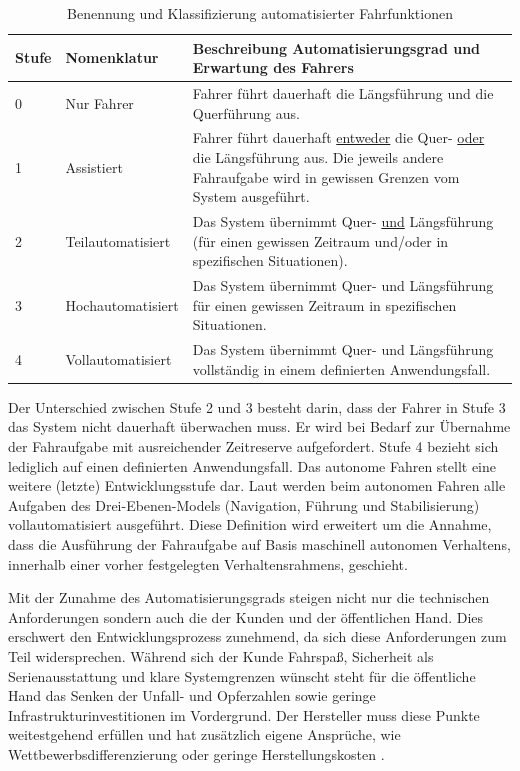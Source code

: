 \begin{table}[htpb]
	\scriptsize
	\caption[Benennung und Klassifizierung automatisierter Fahrfunktionen]{Benennung und Klassifizierung automatisierter Fahrfunktionen \parencite[S. 3]{Gasser.2011}}\label{tab:Automatisierungsgrad}
	\centering
	\begin{tabular}{l p{3cm} p{10cm}}
		\toprule
		Stufe & Nomenklatur & Beschreibung Automatisierungsgrad und Erwartung des Fahrers \\
		\midrule
		0 & Nur Fahrer & Fahrer führt dauerhaft die Längsführung und die Querführung aus. \\
		1 & Assistiert & Fahrer führt dauerhaft \underline{entweder} die Quer- \underline{oder} die Längsführung aus. Die jeweils andere Fahraufgabe wird in gewissen Grenzen vom System ausgeführt. \\
		2 & Teilautomatisiert & Das System übernimmt Quer- \underline{und} Längsführung (für einen gewissen Zeitraum und/oder in spezifischen Situationen). \\
		3 & Hochautomatisiert & Das System übernimmt Quer- und Längsführung für einen gewissen Zeitraum in spezifischen Situationen. \\
		4 & Vollautomatisiert & Das System übernimmt Quer- und Längsführung vollständig in einem definierten Anwendungsfall. \\
		\bottomrule
	\end{tabular}
\end{table}

Der Unterschied zwischen Stufe 2 und 3 besteht darin, dass der Fahrer in Stufe 3 das System nicht dauerhaft überwachen muss. Er wird bei Bedarf zur Übernahme der Fahraufgabe mit ausreichender Zeitreserve aufgefordert. Stufe 4 bezieht sich lediglich auf einen definierten Anwendungsfall. Das autonome Fahren stellt eine weitere (letzte) Entwicklungsstufe dar. Laut \Textcite[S. 34]{Maurer.2015} werden beim autonomen Fahren alle Aufgaben des Drei-Ebenen-Models (Navigation, Führung und Stabilisierung) vollautomatisiert ausgeführt. Diese Definition wird erweitert um die Annahme, dass die Ausführung der Fahraufgabe auf Basis maschinell autonomen Verhaltens, innerhalb einer vorher festgelegten Verhaltensrahmens, geschieht.

Mit der Zunahme des Automatisierungsgrads steigen nicht nur die technischen Anforderungen sondern auch die der Kunden und der öffentlichen Hand. Dies erschwert den Entwicklungsprozess zunehmend, da sich diese Anforderungen zum Teil widersprechen. Während sich der Kunde Fahrspaß, Sicherheit als Serienausstattung und klare Systemgrenzen wünscht steht für die öffentliche Hand das Senken der Unfall- und Opferzahlen sowie geringe Infrastrukturinvestitionen im Vordergrund. Der Hersteller muss diese Punkte weitestgehend erfüllen und hat zusätzlich eigene Ansprüche, wie Wettbewerbsdifferenzierung oder geringe Herstellungskosten \parencite[S. 8]{Meitinger.2008}. %

